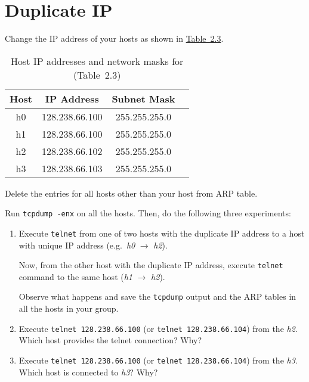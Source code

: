 \documentclass{../UTNetLab}
\begin{document}
\section{Duplicate IP}\label{sec:duplicate-ip}
    Change the IP address of your hosts as shown in \hyperref[tab:2.3]{Table~2.3}.

    \begin{table}[H]
        \caption{Host IP addresses and network masks for  (Table~2.3)}\label{tab:2.3}
        \centering
        \begin{tabular}{ c c c c }
            \hline \hline
            Host & IP Address & Subnet Mask \\
            \hline 
            h0 & 128.238.66.100 & 255.255.255.0 \\
            h1 & 128.238.66.100 & 255.255.255.0 \\
            h2 & 128.238.66.102 & 255.255.255.0 \\
            h3 & 128.238.66.103 & 255.255.255.0 \\
            \hline \hline
            \end{tabular}
    \end{table}

    Delete the entries for all hosts other than your host from ARP table.

    Run \lstinline{tcpdump -enx} on all the hosts.
    Then, do the following three experiments:

    \begin{enumerate}
        \item Execute \lstinline{telnet} from one of two hosts with the duplicate IP address to a host with unique IP address (e.g.\ \textit{h0} $\rightarrow$ \textit{h2}).

        Now, from the other host with the duplicate IP address, execute \lstinline{telnet} command to the same host (\textit{h1} $\rightarrow$ \textit{h2}).

        Observe what happens and save the \lstinline{tcpdump} output and the ARP tables in all the hosts in your group.
        
        \item Execute \lstinline{telnet 128.238.66.100} (or \lstinline{telnet 128.238.66.104}) from the \textit{h2}.
        Which host provides the telnet connection?
        Why?
        
        \item Execute \lstinline{telnet 128.238.66.100} (or \lstinline{telnet 128.238.66.104}) from the \textit{h3}.
    Which host is connected to \textit{h3}? Why?
    \end{enumerate}
    
\end{document}
